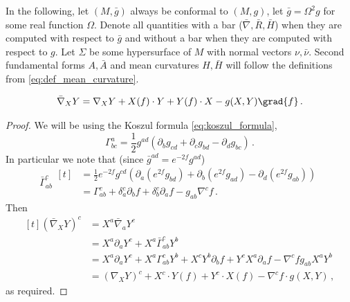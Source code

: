 \documentclass[titlepage,numbers=noenddot,oneside,%
cleardoublepage=empty,paper=a4,fontsize=11pt,%
english,%
]{scrartcl}
\newcommand*{\mathcomma}{\,,}
\newcommand*{\mathfullstop}{\,.}
\begin{document}
In the following, let \( (M,\bar{g}) \) always be conformal to \( (M,g) \), \ie let \( \bar{g}=\Omega^2 g \) for some real function \( \Omega \). Denote all quantities with a bar (\eg \( \bar{\nabla},\bar{R},\bar{H} \)) when they are computed with respect to \( \bar{g} \) and without a bar when they are computed with respect to \( g \). Let \( \Sigma \) be some hypersurface of \( M \) with normal vectors \( \nu,\bar{\nu} \). Second fundamental forms \( A,\bar{A} \) and mean curvatures \( H,\bar{H} \) will follow the definitions from \cref{eq:def_mean_curvature}.

\begin{lemma}\label{lem:conformal_change_connection}
    \begin{equation*}
        \bar{\nabla}_X Y =\nabla_X Y+X(f)\cdot Y+Y(f)\cdot X-g(X,Y)\grad{f}\mathfullstop
    \end{equation*}
\end{lemma}
\begin{proof}
    We will be using the Koszul formula \cref{eq:koszul_formula},
    \begin{equation*}
        \Gamma^a_{bc}=\frac{1}{2}g^{ad}(\partial_b g_{cd}+\partial_c g_{bd}-\partial_d g_{bc})\mathfullstop
    \end{equation*}
    In particular we note that (since \( \bar{g}^{ad}=e^{-2f}g^{ad} \))
    \begin{equation*}
        \bar{\Gamma}^c_{ab}\begin{aligned}[t]
            &=\frac{1}{2}e^{-2f}g^{cd}(\partial_a(e^{2f}g_{bd})+\partial_b(e^{2f}g_{ad})-\partial_d(e^{2f}g_{ab}))\\
            &=\Gamma^c_{ab}+\delta^c_a\partial_b f +\delta^c_b\partial_a f-g_{ab}\nabla^c f\mathfullstop
        \end{aligned}
    \end{equation*}
    Then
    \begin{equation*}
        \begin{aligned}[t]
            (\bar{\nabla}_X Y)^c&=X^a \bar{\nabla}_a Y^c\\
            &=X^a \partial_a Y^c + X^a\bar{\Gamma}_{ab}^c  Y^b\\
            &=X^a \partial_a Y^c +X^a \Gamma_{ab}^c Y^b+X^c Y^b \partial_b f+ Y^c X^a \partial_a f-\nabla^c f g_{ab}X^a Y^b\\
            &=(\nabla_X Y)^c+X^c\cdot Y(f)+Y^c\cdot X(f)-\nabla^c f \cdot g(X,Y)\mathcomma
        \end{aligned}
    \end{equation*}
    as required.
\end{proof}
\end{document}
